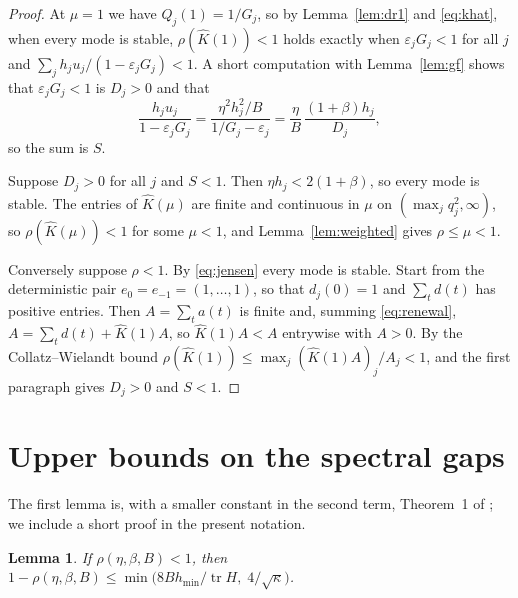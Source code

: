\documentclass[11pt]{amsart}
\newtheorem{lemma}[theorem]{Lemma}
\theoremstyle{definition}
\theoremstyle{remark}
\numberwithin{equation}{section}
\newcommand{\tr}{\operatorname{tr}}
\newcommand{\hmin}{h_{\min}}
\begin{document}
\begin{proof}
At $\mu=1$ we have $Q_j(1)=1/G_j$, so by Lemma~\ref{lem:dr1} and \eqref{eq:khat}, when every mode is stable, $\rho(\widehat K(1))<1$ holds exactly when $\varepsilon_jG_j<1$ for all $j$ and $\sum_jh_ju_j/(1-\varepsilon_jG_j)<1$. A short computation with Lemma~\ref{lem:gf} shows that $\varepsilon_jG_j<1$ is $D_j>0$ and that
\[
\frac{h_ju_j}{1-\varepsilon_jG_j}=\frac{\eta^2h_j^2/B}{1/G_j-\varepsilon_j}=\frac{\eta}{B}\,\frac{(1+\beta)h_j}{D_j},
\]
so the sum is $S$.

Suppose $D_j>0$ for all $j$ and $S<1$. Then $\eta h_j<2(1+\beta)$, so every mode is stable. The entries of $\widehat K(\mu)$ are finite and continuous in $\mu$ on $(\max_jq_j^2,\infty)$, so $\rho(\widehat K(\mu))<1$ for some $\mu<1$, and Lemma~\ref{lem:weighted} gives $\rho\le\mu<1$.

Conversely suppose $\rho<1$. By \eqref{eq:jensen} every mode is stable. Start from the deterministic pair $e_0=e_{-1}=(1,\dots,1)$, so that $d_j(0)=1$ and $\sum_td(t)$ has positive entries. Then $A=\sum_ta(t)$ is finite and, summing \eqref{eq:renewal}, $A=\sum_td(t)+\widehat K(1)A$, so $\widehat K(1)A<A$ entrywise with $A>0$. By the Collatz--Wielandt bound $\rho(\widehat K(1))\le\max_j(\widehat K(1)A)_j/A_j<1$, and the first paragraph gives $D_j>0$ and $S<1$.
\end{proof}

\section{Upper bounds on the spectral gaps}\label{sec:limits}

The first lemma is, with a smaller constant in the second term, Theorem~1 of \cite{MMNK26}; we include a short proof in the present notation.

\begin{lemma}\label{lem:hbupper}
If $\rho(\eta,\beta,B)<1$, then $1-\rho(\eta,\beta,B)\le\min\bigl(8B\hmin/\tr H,\;4/\sqrt\kappa\bigr)$.
\end{lemma}
\end{document}
